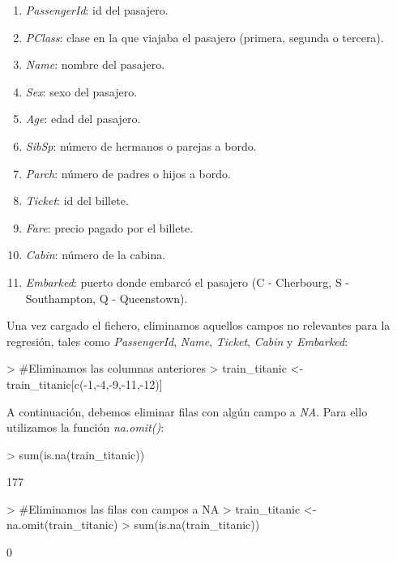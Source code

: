 \documentclass [a4paper] {article}
\begin{document}
\begin{enumerate}
  \item \textit{PassengerId}: id del pasajero.
  \item \textit{PClass}: clase en la que viajaba el pasajero (primera, segunda o tercera).
  \item \textit{Name}: nombre del pasajero.
  \item \textit{Sex}: sexo del pasajero.
  \item \textit{Age}: edad del pasajero.
  \item \textit{SibSp}: número de hermanos o parejas a bordo.
  \item \textit{Parch}: número de padres o hijos a bordo.
  \item \textit{Ticket}: id del billete.
  \item \textit{Fare}: precio pagado por el billete.
  \item \textit{Cabin}: número de la cabina.
  \item \textit{Embarked}: puerto donde embarcó el pasajero (C - Cherbourg, S - Southampton, Q - Queenstown).
\end{enumerate}

Una vez cargado el fichero, eliminamos aquellos campos no relevantes para la regresión, tales como \textit{PassengerId}, \textit{Name}, \textit{Ticket}, \textit{Cabin} y \textit{Embarked}:
\begin{Schunk}
\begin{Sinput}
> #Eliminamos las columnas anteriores
> train_titanic <- train_titanic[c(-1,-4,-9,-11,-12)]
\end{Sinput}
\end{Schunk}
\newpage
A continuación, debemos eliminar filas con algún campo a \textit{NA}. Para ello utilizamos la función \textit{na.omit()}:
\begin{Schunk}
\begin{Sinput}
> sum(is.na(train_titanic))
\end{Sinput}
\begin{Soutput}
[1] 177
\end{Soutput}
\begin{Sinput}
> #Eliminamos las filas con campos a NA
> train_titanic <- na.omit(train_titanic)
> sum(is.na(train_titanic))
\end{Sinput}
\begin{Soutput}
[1] 0
\end{Soutput}
\end{Schunk}
\end{document}
